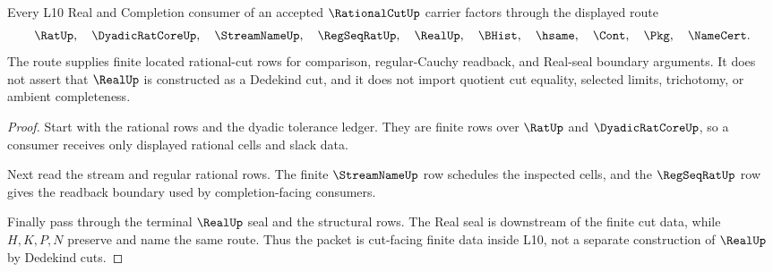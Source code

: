 \begin{theorem}
\label{thm:rational-cut-lten-handoff-boundary}
Every L10 Real and Completion consumer of an accepted $\RationalCutUp$ carrier factors through the displayed route
$$
\RatUp,\quad \DyadicRatCoreUp,\quad \StreamNameUp,\quad \RegSeqRatUp,\quad \RealUp,\quad \BHist,\quad \hsame,\quad \Cont,\quad \Pkg,\quad \NameCert .
$$
The route supplies finite located rational-cut rows for comparison, regular-Cauchy readback, and Real-seal boundary arguments. It does not assert that $\RealUp$ is constructed as a Dedekind cut, and it does not import quotient cut equality, selected limits, trichotomy, or ambient completeness.
\end{theorem}
\begin{proof}
Start with the rational rows and the dyadic tolerance ledger. They are finite rows over $\RatUp$ and $\DyadicRatCoreUp$, so a consumer receives only displayed rational cells and slack data.

Next read the stream and regular rational rows. The finite $\StreamNameUp$ row schedules the inspected cells, and the $\RegSeqRatUp$ row gives the readback boundary used by completion-facing consumers.

Finally pass through the terminal $\RealUp$ seal and the structural rows. The Real seal is downstream of the finite cut data, while $H,K,P,N$ preserve and name the same route. Thus the packet is cut-facing finite data inside L10, not a separate construction of $\RealUp$ by Dedekind cuts.
\end{proof}


\begin{closurestatus}{\RationalCutUp}
  \theoryclosure{\seedClosure}
  \formalstatus{\unformalizedV}
\end{closurestatus}
